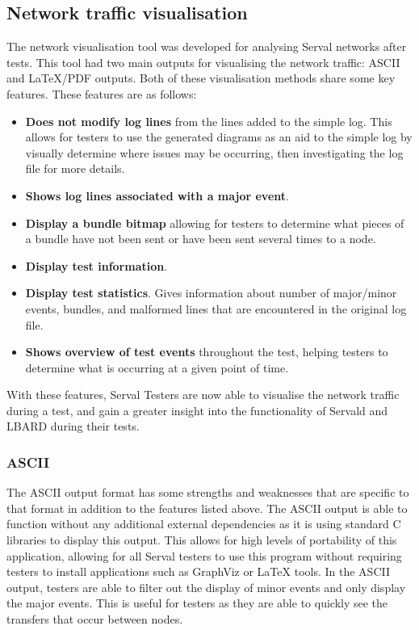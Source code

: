 \subsection{Network traffic visualisation}
The network visualisation tool was developed for analysing Serval networks  after tests.
This tool had two main outputs for visualising the network traffic: ASCII and LaTeX/PDF outputs.
Both of these visualisation methods share some key features.
These features are as follows:
\begin{itemize}
    \item \textbf{Does not modify log lines} from the lines added to the simple log. 
    This allows for testers to use the generated diagrams as an aid to the simple log by visually determine where issues may be occurring, then investigating the log file for more details. 
    \item \textbf{Shows log lines associated with a major event}. 
    \item \textbf{Display a bundle bitmap} allowing for testers to determine what pieces of a bundle have not been sent or have been sent several times to a node.
    \item \textbf{Display test information}.
    \item \textbf{Display test statistics}. 
    Gives information about number of major/minor events, bundles, and malformed lines that are encountered in the original log file.
    \item \textbf{Shows overview of test events} throughout the test, helping testers to determine what is occurring at a given point of time.
\end{itemize}
With these features, Serval Testers are now able to visualise the network traffic during a test, and gain a greater insight into the functionality of Servald and LBARD during their tests.

\subsubsection{ASCII}
The ASCII output format has some strengths and weaknesses that are specific to that format in addition to the features listed above.
The ASCII output is able to function without any additional external dependencies as it is using standard C libraries to display this output.
This allows for high levels of portability of this application, allowing for all Serval testers to use this program without requiring testers to install applications such as GraphViz or LaTeX tools.
In the ASCII output, testers are able to filter out the display of minor events and only display the major events.
This is useful for testers as they are able to quickly see the transfers that occur between nodes.

